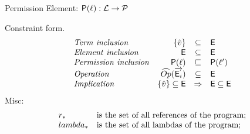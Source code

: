 \documentclass[[12pt,a4paper,twoside,openrigh]{report}
\begin{document}
Permission Element: $\mathsf{P}(\ell) : {\mathcal L} \rightarrow \mathcal{P} $


Constraint form.
\[
\begin{array}{lrcl}
\mathit{Term\ inclusion} & \{\hat{v}\} & \subseteq & \mathsf{E} \\
\mathit{Element\ inclusion} & \mathsf{E} & \subseteq & \mathsf{E} \\
\mathit{Permission\ inclusion} & \mathsf{P}(\ell) & \sqsubseteq & \mathsf{P}(\ell') \\
\mathit{Operation} & \widehat{Op}(\overrightarrow{\mathsf{E}_i}) & \subseteq & \mathsf{E} \\
\mathit{Implication} & \{\hat{v}\} \subseteq \mathsf{E} & \Rightarrow & \mathsf{E} \subseteq \mathsf{E} \\
\end{array}
\]
Misc:
\[
\begin{array}{l l}
r_* & $is the set of all references of the program;$\\
lambda_* & $is the set of all lambdas of the program;$\\
\end{array}
\]
\end{document}
